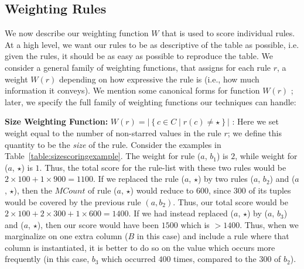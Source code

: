 \documentclass[10pt,journal,compsoc]{IEEEtran}
\newcommand{\stitle}[1]{\vspace{0.5em}\noindent\textbf{#1}}
\newcommand{\papertext}[1]{}
\newcommand{\techreporttext}[1]{#1}
\begin{document}
\subsection{Weighting Rules}
\label{sec:weighting}
We now describe our weighting function $W$ that is used to score individual rules. 
At a high level, we want our rules to be as descriptive of the table as possible, i.e. given the rules, it should be as easy as possible to reproduce the table. We consider a general family of weighting functions, that assigns for each rule $r$, a weight $W(r)$ depending on how expressive the rule is (i.e., how much information
it conveys). We mention some canonical forms for function $W(r)$ \papertext{(their detailed interpretations are described in the technical report)}; later, we specify the full
family of weighting functions our techniques can handle:

\stitle{Size Weighting Function:} 
\techreporttext{$W(r) = |\left\lbrace c \in C \mid r(c) \neq \star \right\rbrace |$ : 
Here we set weight equal to the number of non-starred values in the rule $r$; we define this quantity to be the {\em size} of the rule. Consider the examples in Table~\ref{table:sizescoringexample}. The weight for rule ($a$, $b_1$) is $2$, while weight for ($a$, $\star$) is $1$. Thus, the total score for the rule-list with these two rules would be $2 \times 100 + 1 \times 900 = 1100$. If we replaced the rule ($a$, $\star$) by two rules ($a$, $b_2$) and ($a$, $\star$), then the $MCount$ of rule ($a$, $\star$) would reduce to $600$, since $300$ of its tuples would be covered by the previous rule $(a, b_2)$. Thus, our total score would be $2 \times 100 + 2 \times 300 + 1 \times 600 = 1400$. If we had instead replaced ($a$, $\star$) by ($a$, $b_3$) and ($a$, $\star$), then our score would have been $1500$ which is $> 1400$. Thus, when we marginalize on one extra column ($B$ in this case) and include a rule where that column is instantiated, it is better to do so on the value which occurs more frequently (in this case, $b_3$ which occurred $400$ times, compared to the $300$ of $b_2$).} \papertext{$W(r) = |\left\lbrace c \in C \mid r(c) \neq \star \right\rbrace |$ : 
Here we set weight equal to the number of non-starred values in the rule $r$ i.e. the {\em size} of the rule. For example, in Table~\ref{table:introexample}, the rule (Target, bicycles, $\star$) has weight $2$.}
\end{document}
